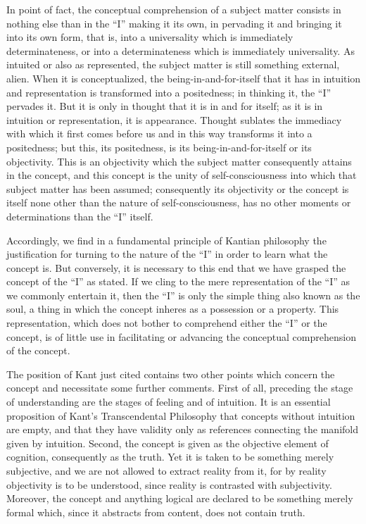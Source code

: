 In point of fact, the conceptual comprehension of a subject matter
consists in nothing else than in the “I” making it its own,
in pervading it and bringing it into its own form,
that is, into a universality which is immediately determinateness,
or into a determinateness which is immediately universality.
As intuited or also as represented, the subject matter is
still something external, alien.
When it is conceptualized, the being-in-and-for-itself
that it has in intuition and representation is
transformed into a positedness;
in thinking it, the “I” pervades it.
But it is only in thought that it is in and for itself;
as it is in intuition or representation, it is appearance.
Thought sublates the immediacy with which it first comes before us
and in this way transforms it into a positedness;
but this, its positedness, is its being-in-and-for-itself
or its objectivity.
This is an objectivity which the subject matter
consequently attains in the concept,
and this concept is the unity of self-consciousness
into which that subject matter has been assumed;
consequently its objectivity or the concept is
itself none other than the nature of self-consciousness,
has no other moments or determinations than the “I” itself.

Accordingly, we find in a fundamental principle of Kantian philosophy
the justification for turning to the nature of the “I”
in order to learn what the concept is.
But conversely, it is necessary to this end
that we have grasped the concept of the “I” as stated.
If we cling to the mere representation of the “I”
as we commonly entertain it,
then the “I” is only the simple thing
also known as the soul,
a thing in which the concept inheres
as a possession or a property.
This representation, which does not bother
to comprehend either the “I” or the concept,
is of little use in facilitating or advancing
the conceptual comprehension of the concept.

The position of Kant just cited contains
two other points which concern the concept
and necessitate some further comments.
First of all, preceding the stage of understanding are
the stages of feeling and of intuition.
It is an essential proposition of Kant's Transcendental Philosophy
that concepts without intuition are empty,
and that they have validity only as references
connecting the manifold given by intuition.
Second, the concept is given as
the objective element of cognition,
consequently as the truth.
Yet it is taken to be something merely subjective,
and we are not allowed to extract reality from it,
for by reality objectivity is to be understood,
since reality is contrasted with subjectivity.
Moreover, the concept and anything logical are
declared to be something merely formal
which, since it abstracts from content,
does not contain truth.

